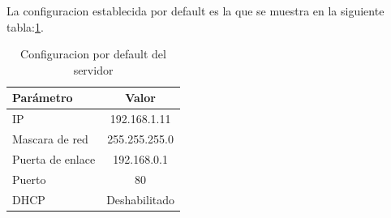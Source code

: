 La configuracion establecida por default es la que se muestra en la siguiente tabla:\ref{tab:servercfg}.

\begin{table}[!h]
  \centering
  \begin{tabular}{l c}
    \hline 
    Parámetro    & Valor \\
    \hline \hline
    IP               & 192.168.1.11 \\
    Mascara de red   & 255.255.255.0 \\
    Puerta de enlace & 192.168.0.1 \\
    Puerto           & 80 \\
    DHCP             & Deshabilitado \\
    \hline
  \end{tabular}
  \caption{Configuracion por default del servidor}
  \label{tab:servercfg}
\end{table}


%
%	
%
%
%
%
%
%
%	
%		
%
%		
%		
%		
%		
%


